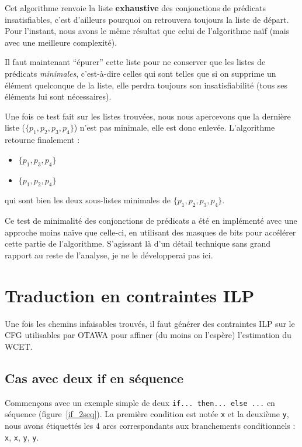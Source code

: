 \documentclass[french]{article}
\begin{document}
  Cet algorithme renvoie la liste \textbf{exhaustive} des conjonctions de prédicats insatisfiables, c'est d'ailleurs pourquoi on retrouvera toujours la liste de départ. Pour l'instant, nous avons le même résultat que celui de l'algorithme naïf (mais avec une meilleure complexité).
  
  Il faut maintenant ``épurer'' cette liste pour ne conserver que les listes de prédicats \textit{minimales}, c'est-à-dire celles qui sont telles que si on supprime un élément quelconque de la liste, elle perdra toujours son insatisfiabilité (tous ses éléments lui sont nécessaires).
  
  Une fois ce test fait sur les listes trouvées, nous nous apercevons que la dernière liste ($\{p_1, p_2, p_3, p_4\}$) n'est pas minimale, elle est donc enlevée. L'algorithme retourne finalement :
  
  \begin{itemize}
    \item $\{p_1, p_3, p_4\}$
    \item $\{p_1, p_2, p_4\}$
  \end{itemize}
  
  qui sont bien les deux sous-listes minimales de $\{p_1, p_2, p_3, p_4\}$.
  
  Ce test de minimalité des conjonctions de prédicats a été en implémenté avec une approche moins naïve que celle-ci, en utilisant des masques de bits pour accélérer cette partie de l'algorithme. S'agissant là d'un détail technique sans grand rapport au reste de l'analyse, je ne le développerai pas ici.

  \newpage{}
  \section{Traduction en contraintes ILP}
  Une fois les chemins infaisables trouvés, il faut générer des contraintes ILP sur le CFG utilisables par OTAWA pour affiner (du moins on l'espère) l'estimation du WCET.

  \subsection{Cas avec deux if en séquence}
   Commençons avec un exemple simple de deux \texttt{if... then... else ...} en séquence (figure~\ref{if_2seq}). La première condition est notée \texttt{x} et la deuxième \texttt{y}, nous avons étiquettés les 4 arcs correspondants aux branchements conditionnels : \texttt{x}, \texttt{\textlnot x}, \texttt{y}, \texttt{\textlnot y}.
\end{document}
